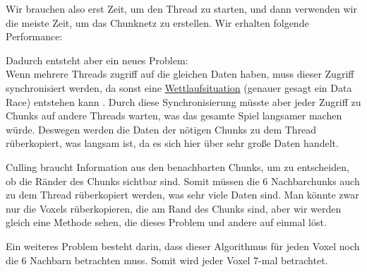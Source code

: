 Wir brauchen also erst Zeit, um den Thread zu starten,
und dann verwenden wir die meiste Zeit, um das
Chunknetz zu erstellen.
Wir erhalten folgende Performance:

\vspace{0.3cm}


\vspace{0.3cm}

Dadurch entsteht aber ein neues Problem: \\
Wenn mehrere Threads zugriff auf die gleichen Daten
haben, muss dieser Zugriff synchronisiert werden,
da sonst eine
\href{https://de.wikipedia.org/wiki/Wettlaufsituation}{Wettlaufsituation}
\cite{wiki_wettlauf} (genauer gesagt ein Data Race)
entstehen kann \cite{nomicon_races}.
Durch diese Synchronisierung müsste aber jeder Zugriff
zu Chunks auf andere Threads warten, was das gesamte
Spiel langsamer machen würde. Deswegen werden die
Daten der nötigen Chunks zu dem Thread rüberkopiert,
was langsam ist, da es sich hier über sehr große Daten
handelt.

Culling braucht Information aus den benachbarten
Chunks, um zu entscheiden, ob die Ränder des Chunks
sichtbar sind. Somit müssen die 6 Nachbarchunks
auch zu dem Thread rüberkopiert werden, was sehr viele
Daten sind. Man könnte zwar nur die Voxels
rüberkopieren, die am Rand des Chunks sind,
aber wir werden gleich eine Methode sehen,
die dieses Problem und andere auf einmal löst.

\vspace{0.3cm}

Ein weiteres Problem besteht darin, dass dieser
Algorithmus für jeden Voxel noch die 6 Nachbarn
betrachten muss. Somit wird jeder Voxel 7-mal
betrachtet.
